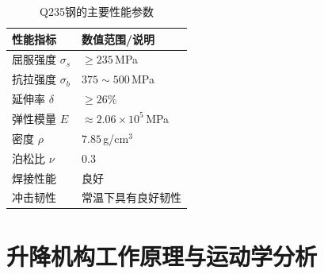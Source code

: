 \begin{table}[htbp]
    \wuhao
    \centering
    \caption{Q235钢的主要性能参数}
    \label{tab:q235}
    \begin{tabular}{p{3.5cm}p{4.5cm}}
    \toprule
    性能指标 & 数值范围/说明 \\
    \midrule
    屈服强度 $\sigma_s$ & $\geq 235$\,MPa \\
    抗拉强度 $\sigma_b$ & $375 \sim 500$\,MPa \\
    延伸率 $\delta$ & $\geq 26\%$ \\
    弹性模量 $E$ & $\approx 2.06 \times 10^{5}$\,MPa \\
    密度 $\rho$ & $7.85$\,g/cm$^3$ \\
    泊松比 $\nu$ & 0.3 \\
    焊接性能 & 良好 \\
    冲击韧性 & 常温下具有良好韧性 \\
    \bottomrule
    \end{tabular}
\end{table}

\section{升降机构工作原理与运动学分析}

